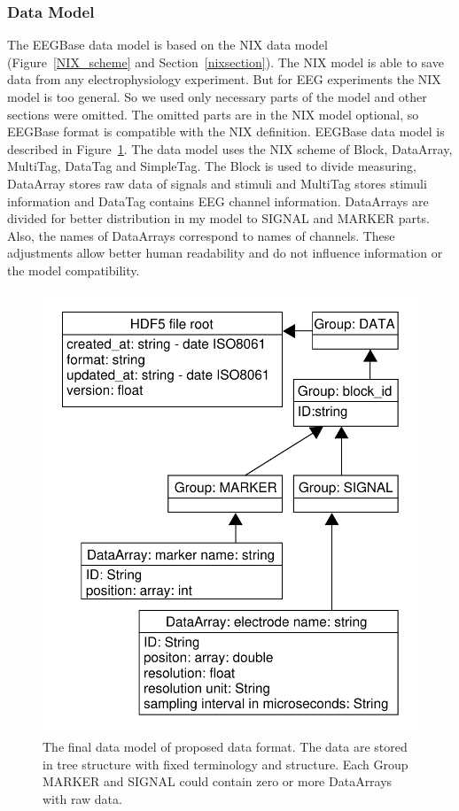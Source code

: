 \documentclass[conference]{IEEEtran}
\begin{document}
\subsubsection{Data Model}
\label{section_data}
The EEGBase data model is based on the NIX data model (Figure~\ref{NIX_scheme} and Section~\ref{nixsection}). The NIX model is able to save data from any electrophysiology experiment. But for EEG experiments the NIX model is too general. So we used only necessary parts of the model and other sections were omitted. The omitted parts are in the NIX model optional, so EEGBase format is compatible with the NIX definition. EEGBase data model is described in Figure~\ref{format_scheme}. The data model uses the NIX scheme of Block, DataArray, MultiTag, DataTag and SimpleTag. The Block is used to divide measuring, DataArray stores raw data of signals and stimuli and MultiTag stores stimuli information and DataTag contains EEG channel information. DataArrays are divided for better distribution in my model to SIGNAL and MARKER parts. Also, the names of DataArrays correspond to names of channels. These adjustments allow better human readability and do not influence information or the model compatibility.

\begin{figure}
	\begin{center}
		\includegraphics[scale=0.51]{obrazky/data.pdf}
		\caption{The final data model of proposed data format. The data are stored in tree structure with fixed terminology and structure. Each Group MARKER and SIGNAL could contain zero or more DataArrays with raw data.}
		\label{format_scheme}
	\end{center}
\end{figure}
\end{document}
